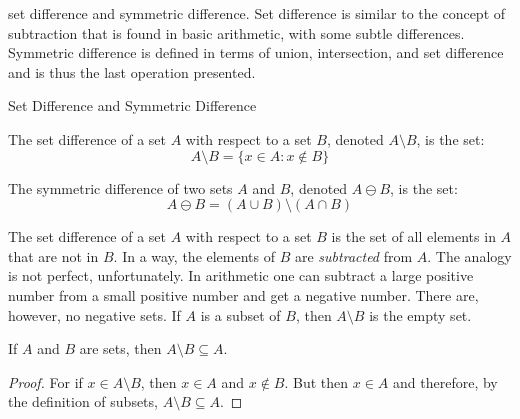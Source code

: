             set difference and symmetric difference. Set
            difference is similar to the concept of subtraction
            that is found in basic arithmetic, with some subtle
            differences. Symmetric difference is defined in terms
            of union, intersection, and set difference and is
            thus the last operation presented.
            \begin{fdefinition*}
                  {Set Difference and Symmetric Difference}{}
                \begin{definition}
                    The set difference of a set $A$ with respect
                    to a set $B$, denoted $A\setminus{B}$,
                    is the set:
                    \begin{equation*}
                        A\setminus{B}=
                        \{x\in{A}:x\notin{B}\}
                    \end{equation*}
                \end{definition}
                \begin{definition}
                    The symmetric difference of two sets $A$ and
                    $B$, denoted $A\ominus{B}$, is the set:
                    \begin{equation*}
                        A\ominus{B}=
                        (A\cup{B})\setminus(A\cap{B})
                    \end{equation*}
                \end{definition}
            \end{fdefinition*}
            The set difference of a set $A$ with respect to a
            set $B$ is the set of all elements in $A$ that are
            not in $B$. In a way, the elements of $B$ are
            \textit{subtracted} from $A$. The analogy is not
            perfect, unfortunately. In arithmetic one
            can subtract a large positive number from a small
            positive number and get a \textrm{negative} number.
            There are, however, no negative sets. If $A$ is a
            subset of $B$, then $A\setminus{B}$ is the empty set.
            \begin{theorem}
                \label{thm:Subset_of_Set_Difference}%
                If $A$ and $B$ are sets, then $A\setminus{B}\subseteq{A}$.
            \end{theorem}
            \begin{proof}
                For if $x\in{A}\setminus{B}$, then
                $x\in{A}$ and $x\notin{B}$. But then
                $x\in{A}$ and therefore, by
                the definition of subsets,
                $A\setminus{B}\subseteq{A}$.
            \end{proof}
